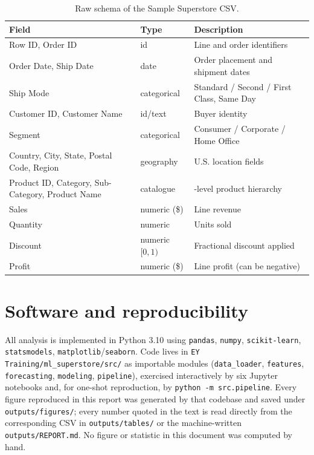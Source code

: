 \begin{table}[H]
  \centering
  \caption{Raw schema of the Sample Superstore CSV.}
  \label{tab:intro-schema}
  \small
  \begin{tabular}{@{}>{\raggedright\arraybackslash}p{4.5cm}
                    >{\raggedright\arraybackslash}p{2.2cm}
                    >{\raggedright\arraybackslash}p{7.3cm}@{}}
    \toprule
    \textbf{Field} & \textbf{Type} & \textbf{Description} \\
    \midrule
    Row ID, Order ID & id & Line and order identifiers \\
    Order Date, Ship Date & date & Order placement and shipment dates \\
    Ship Mode & categorical & Standard / Second / First Class, Same Day \\
    Customer ID, Customer Name & id/text & Buyer identity \\
    Segment & categorical & Consumer / Corporate / Home Office \\
    Country, City, State, Postal Code, Region & geography & U.S. location fields \\
    Product ID, Category, Sub-Category, Product Name & catalogue & 3-level product hierarchy \\
    Sales & numeric (\$) & Line revenue \\
    Quantity & numeric & Units sold \\
    Discount & numeric $[0,1)$ & Fractional discount applied \\
    Profit & numeric (\$) & Line profit (can be negative) \\
    \bottomrule
  \end{tabular}
\end{table}

\section{Software and reproducibility}
All analysis is implemented in Python 3.10 using \texttt{pandas},
\texttt{numpy}, \texttt{scikit-learn}, \texttt{statsmodels},
\texttt{matplotlib}/\texttt{seaborn}. Code lives in
\texttt{EY Training/ml\_superstore/src/} as importable modules
(\texttt{data\_loader}, \texttt{features}, \texttt{forecasting},
\texttt{modeling}, \texttt{pipeline}), exercised interactively by six
Jupyter notebooks and, for one-shot reproduction, by
\texttt{python -m src.pipeline}. Every figure reproduced in this report was
generated by that codebase and saved under \texttt{outputs/figures/}; every
number quoted in the text is read directly from the corresponding CSV in
\texttt{outputs/tables/} or the machine-written \texttt{outputs/REPORT.md}.
No figure or statistic in this document was computed by hand.

